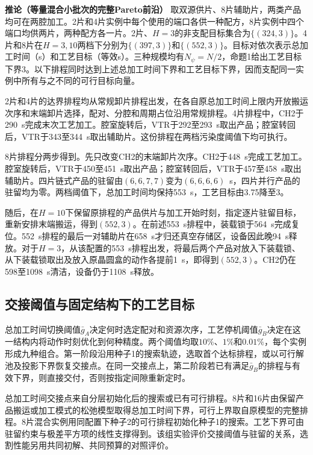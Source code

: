 \documentclass[preprint,12pt,nonatbib]{elsarticle}
\begin{document}
\noindent\textbf{推论（等量混合小批次的完整Pareto前沿）}\quad
取双源供片、8片辅助片，两类产品均可在两腔加工。2片和4片实例中每个使用的端口各供一种配方，8片实例中四个端口均供两片，两种配方各一片。2片、$H=3$的非支配目标集合为$\{(324,3)\}$。4片和8片在$H=3,10$两档下分别为$\{(397,3)\}$和$\{(552,3)\}$。目标对依次表示总加工时间（s）和工艺目标（等效s）。三种规模均有$N_\psi=N/2$，命题1给出工艺目标下界3。以下排程同时达到上述总加工时间下界和工艺目标下界，因而支配同一实例中所有与之不同的可行目标向量。

2片和4片的达界排程均从常规卸片排程出发，在各自原总加工时间上限内开放搬运次序和末端卸片选择，配对、分腔和周期占位沿用常规排程。4片排程中，CH2于290~s完成末次工艺加工。腔室旋转后，VTR于292至293~s取出产品；腔室转回后，VTR于343至344~s取出辅助片。这份排程在两档污染度阈值下均可执行。

8片排程分两步得到。先只改变CH2的末端卸片次序。CH2于448~s完成工艺加工。腔室旋转后，VTR于450至451~s取出产品；腔室转回后，VTR于457至458~s取出辅助片。四片链式产品的驻留由$(6,6,7,7)$变为$(6,6,6,6)$~s，四片并行产品的驻留均为零。两档阈值下，总加工时间均保持553~s，工艺目标由3.75降至3。

随后，在$H=10$下保留原排程的产品供片与加工开始时刻，指定逐片驻留目标，重新安排末端搬运，得到$(552,3)$。在前述553~s排程中，装载锁于564~s完成复位。552~s排程的最后一对辅助片在658~s才归还真空存储区，设备因此晚94~s释放。对于$H=3$，从该配置的553~s排程出发，将最后两个产品对放入下装载锁、从下装载锁取出及放入原晶圆盒的动作各提前1~s，即得到$(552,3)$。CH2仍在598至1098~s清洁，设备仍于1108~s释放。

\subsection{交接阈值与固定结构下的工艺目标}
\label{sec:gap-switch-results-cn}

总加工时间切换阈值$\bar g_A$决定何时选定配对和资源次序，工艺停机阈值$\bar g_B$决定在这一结构内将动作时刻优化到何种精度。两个阈值均取$10\%$、$1\%$和$0.01\%$，每个实例形成九种组合。第一阶段沿用种子1的搜索轨迹，选取首个达标排程，或以可行解池及投影下界恢复交接点。在同一交接点上，第二阶段若已有满足$\bar g_B$的排程与有效下界，则直接交付，否则按指定间隙重新定时。

总加工时间交接点来自分层初始化后的搜索或已有可行排程。8片和16片由保留产品搬运或加工模式的松弛模型取得总加工时间下界，可行上界取自原模型的完整排程。8片混合实例用同配置下种子2的可行排程初始化种子1的搜索。工艺下界可由驻留约束与极差平方项的线性支撑得到。该组实验评价交接阈值与驻留的关系，选割性能另用共同初解、共同预算的对照评价。
\end{document}

